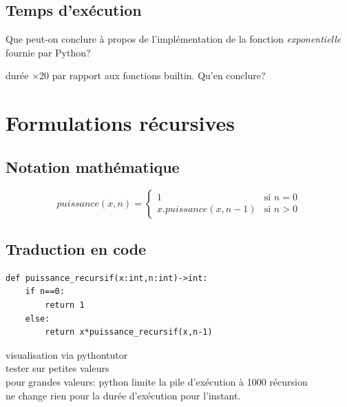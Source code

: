 \documentclass[a4paper,11pt]{article}
\begin{document}
\begin{Form}
\subsection{Temps d'exécution}
\begin{activite}
Que peut-on conclure à propos de l'implémentation de la fonction \emph{exponentielle} fournie par Python?
\end{activite}
\begin{commentprof}
durée ×20 par rapport aux fonctions builtin. Qu'en conclure?
\end{commentprof}
\section{Formulations récursives}
\subsection{Notation mathématique}
$$
puissance(x,n) = \left\{
    \begin{array}{ll}
        1 & \mbox{si } n=0 \\
        x.puissance(x,n-1) & \mbox{si } n>0
    \end{array}
\right.
$$
\subsection{Traduction en code}
\begin{lstlisting}
def puissance_recursif(x:int,n:int)->int:
    if n==0:
        return 1
    else:
        return x*puissance_recursif(x,n-1)
\end{lstlisting}
\begin{commentprof}
visualisation via pythontutor\\
tester sur petites valeurs\\
pour grandes valeurs: python limite la pile d'exécution à 1000 récursion\\
ne change rien pour la durée d'exécution pour l'instant.
\end{commentprof}

\end{Form}
\end{document}
